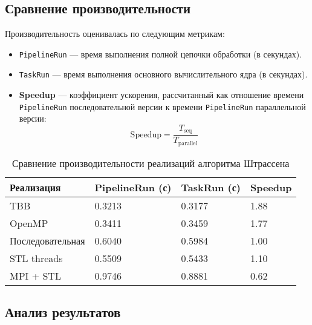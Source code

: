 \documentclass[14pt,a4paper]{extarticle}
\begin{document}
\subsection{Сравнение производительности}

Производительность оценивалась по следующим метрикам:
\begin{itemize}
    \item \texttt{PipelineRun} — время выполнения полной цепочки обработки (в секундах).
    \item \texttt{TaskRun} — время выполнения основного вычислительного ядра (в секундах).
    \item \textbf{Speedup} — коэффициент ускорения, рассчитанный как отношение времени \texttt{PipelineRun} последовательной версии к времени \texttt{PipelineRun} параллельной версии:
    \[
    \text{Speedup} = \frac{T_{\text{seq}}}{T_{\text{parallel}}}
    \]
\end{itemize}

\renewcommand{\arraystretch}{1.3}
\begin{table}[H]
\centering
\footnotesize
\begin{tabularx}{\textwidth}{|l|X|X|X|}
\hline
\textbf{Реализация} & \textbf{PipelineRun (с)} & \textbf{TaskRun (с)} & \textbf{Speedup} \\
\hline
TBB & 0.3213 & 0.3177 & 1.88 \\
\hline
OpenMP & 0.3411 & 0.3459 & 1.77 \\
\hline
Последовательная & 0.6040 & 0.5984 & 1.00 \\
\hline
STL threads & 0.5509 & 0.5433 & 1.10 \\
\hline
MPI + STL & 0.9746 & 0.8881 & 0.62 \\
\hline
\end{tabularx}
\caption{Сравнение производительности реализаций алгоритма Штрассена}
\end{table}

\subsection{Анализ результатов}
\end{document}
